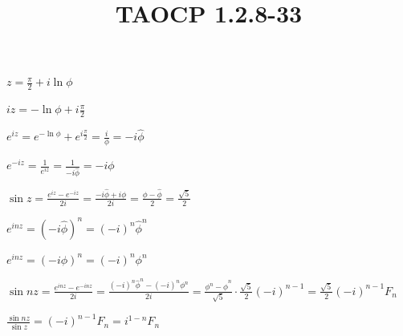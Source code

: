 \documentclass{article}
\title{TAOCP 1.2.8\mbox{-}33}
\begin{document}
\maketitle

\( z = \frac{\pi}{2} + i \ln \phi \)

\( iz = -\ln\phi + i\frac{\pi}{2} \)

\( e^{iz} = e^{-\ln\phi} + e^{i\frac{\pi}{2}} = \frac{i}{\phi} = -i\hat{\phi} \)

\( e^{-iz} = \frac{1}{e^{iz}} = \frac{1}{-i\hat{\phi}} = -i\phi \)

\( \sin z = \frac{e^{iz} - e^{-iz}}{2i} = \frac{-i\hat{\phi} + i\phi}{2i} = \frac{\phi - \hat{\phi}}{2} = \frac{\sqrt{5}}{2} \)

\( e^{inz} = {(-i\hat{\phi})}^{n} = {(-i)}^{n}\hat{\phi}^{n} \)

\( e^{inz} = {(-i\phi)}^{n} = {(-i)}^{n}\phi^{n} \)

\( \sin nz = \frac{e^{inz} - e^{-inz}}{2i} = \frac{{(-i)}^{n}\hat{\phi}^{n} - {(-i)}^{n}\phi^{n}}{2i} = \frac{\phi^{n} - \hat{\phi}^{n}}{\sqrt{5}}\cdot\frac{\sqrt{5}}{2}{(-i)}^{n-1} = \frac{\sqrt{5}}{2} {(-i)}^{n-1} F_{n} \)

\( \frac{\sin nz}{\sin z} = {(-i)}^{n-1}F_{n} = i^{1-n}F_{n} \)
\end{document}
